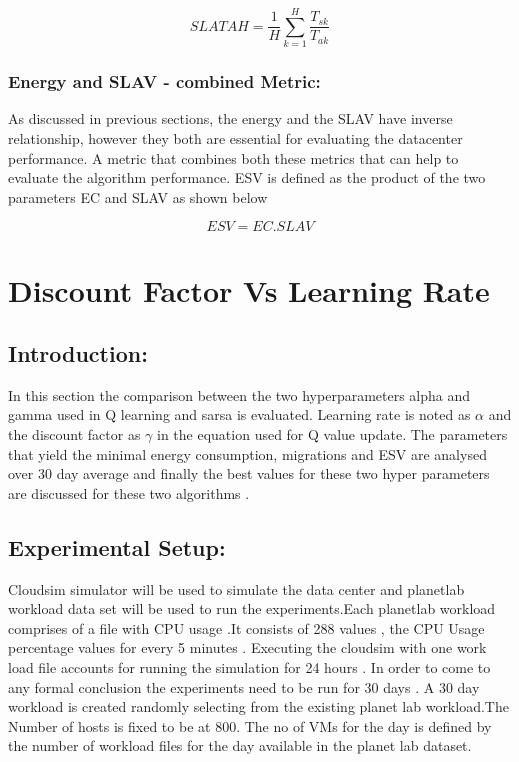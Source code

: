 \documentclass[a4paper,12pt]{Classes/RoboticsLaTeX}
\begin{document}
    \begin{equation}
    SLATAH = \frac{1}{H} \sum_{k=1}^{H} \frac{T_{sk}}{T_{ak}}
    \end{equation}

    \subsection{Energy and SLAV - combined Metric:}
    As discussed in previous sections, the energy and the SLAV have inverse relationship, however they both are essential for evaluating the datacenter performance. A metric that combines both these metrics that can help to evaluate the algorithm performance. ESV is defined as the product of the two parameters EC and SLAV as shown below

    \begin{equation}
     ESV = EC. SLAV 
     \end{equation}

    
    \chapter{Discount Factor Vs Learning Rate}
    \label{chap:hyperparams}
 
      \section{Introduction:}
      In this section the comparison between the two hyperparameters alpha and gamma used in Q learning and sarsa is evaluated. Learning rate is noted as $\alpha$ and the discount factor as $\gamma$ in the equation used for Q value update.
      The parameters that yield the minimal energy consumption, migrations and ESV are analysed over 30 day average and finally the best values for these two hyper parameters are discussed for these two algorithms . 

      \section{Experimental Setup:}
      
      Cloudsim simulator will be used to simulate the data center and planetlab workload data set will be used to run the experiments.Each planetlab workload comprises of a file with CPU usage .It consists of 288 values , the CPU Usage percentage values for every 5 minutes . Executing the cloudsim with one work load file accounts for running the simulation for 24 hours  . In order to come to any formal conclusion the experiments  need to be run for 30 days . A 30 day workload is created randomly selecting from the existing planet lab workload.The Number of hosts is fixed to be at 800. The no of VMs for the day is defined by the number of workload files for the day available in the planet lab dataset.
\end{document}
